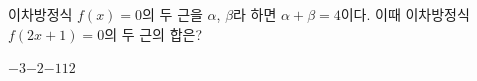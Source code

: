 이차방정식 $f(x)=0$의 두 근을 $\alpha$, $\beta$라 하면 $\alpha+\beta=4$이다. 이때 이차방정식 $f(2x+1)=0$의 두 근의 합은?
\begin{choices32}{$-3$}{$-2$}{$-1$}{$1$}{$2$}\end{choices32}
